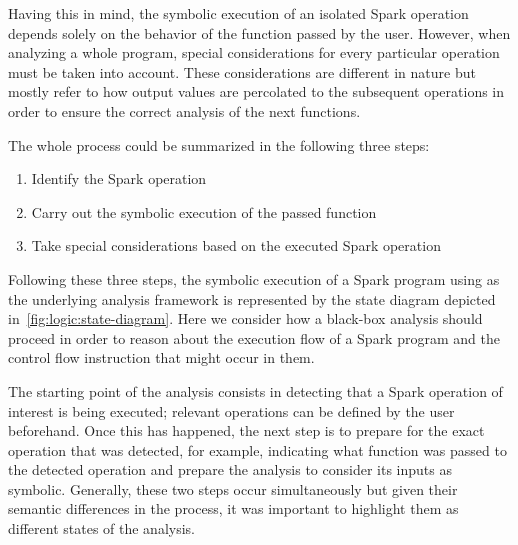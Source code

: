 %	
%	
%	
%	

Having this in mind, the symbolic execution of an isolated Spark operation depends solely on the behavior of the function passed by the user. However, when analyzing a whole program, special considerations for every particular operation must be taken into account. These considerations are different in nature but mostly refer to how output values are percolated to the subsequent operations in order to ensure the correct analysis of the next functions.

The whole process could be summarized in the following three steps:
\begin{enumerate}
	\item Identify the Spark operation
	\item Carry out the symbolic execution of the passed function
	\item Take special considerations based on the executed Spark operation
\end{enumerate}

Following these three steps, the symbolic execution of a Spark program using \spf as the underlying analysis framework is represented by the state diagram depicted in~\ref{fig:logic:state-diagram}. Here we consider how a black-box analysis should proceed in order to reason about the execution flow of a Spark program and the control flow instruction that might occur in them.

The starting point of the analysis consists in detecting that a Spark operation of interest is being executed; relevant operations can be defined by the user beforehand. Once this has happened, the next step is to prepare for the exact operation that was detected, for example, indicating what function was passed to the detected operation and prepare the \spf analysis to consider its inputs as symbolic. Generally, these two steps occur simultaneously but given their semantic differences in the process, it was important to highlight them as different states of the analysis.

